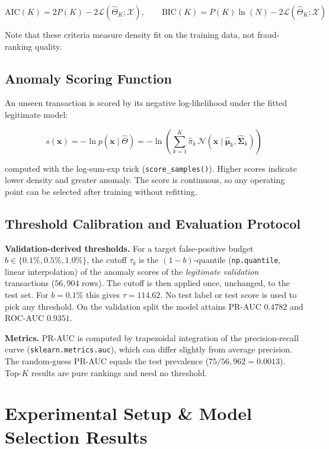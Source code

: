 \documentclass[11pt, a4paper]{article}
\begin{document}
\begin{equation}
\text{AIC}(K) = 2P(K) - 2\mathcal{L}(\hat{\Theta}_K; \mathcal{X}), \qquad \text{BIC}(K) = P(K)\ln(N) - 2\mathcal{L}(\hat{\Theta}_K; \mathcal{X})
\end{equation}

Note that these criteria measure density fit on the training data, not fraud-ranking quality.

\subsection{Anomaly Scoring Function}
An unseen transaction is scored by its negative log-likelihood under the fitted legitimate model:

\begin{equation}
s(\mathbf{x}) = -\ln p(\mathbf{x} \mid \hat{\Theta}) = -\ln \left( \sum_{k=1}^{K} \hat{\pi}_k \, \mathcal{N}(\mathbf{x} \mid \hat{\boldsymbol{\mu}}_k, \hat{\boldsymbol{\Sigma}}_k) \right)
\end{equation}

computed with the log-sum-exp trick (\texttt{score\_samples()}). Higher scores indicate lower density and greater anomaly. The score is continuous, so any operating point can be selected after training without refitting.

\subsection{Threshold Calibration and Evaluation Protocol}
\label{sec:protocol}
\textbf{Validation-derived thresholds.} For a target false-positive budget $b \in \{0.1\%, 0.5\%, 1.0\%\}$, the cutoff $\tau_b$ is the $(1-b)$-quantile (\texttt{np.quantile}, linear interpolation) of the anomaly scores of the \emph{legitimate validation} transactions ($56{,}904$ rows). The cutoff is then applied once, unchanged, to the test set. For $b = 0.1\%$ this gives $\tau = 114.62$. No test label or test score is used to pick any threshold. On the validation split the model attains PR-AUC $0.4782$ and ROC-AUC $0.9351$.

\textbf{Metrics.} PR-AUC is computed by trapezoidal integration of the precision-recall curve (\texttt{sklearn.metrics.auc}), which can differ slightly from average precision. The random-guess PR-AUC equals the test prevalence ($75/56{,}962 = 0.0013$). Top-$K$ results are pure rankings and need no threshold.

\section{Experimental Setup \& Model Selection Results}
\label{sec:aicbic}
\end{document}
